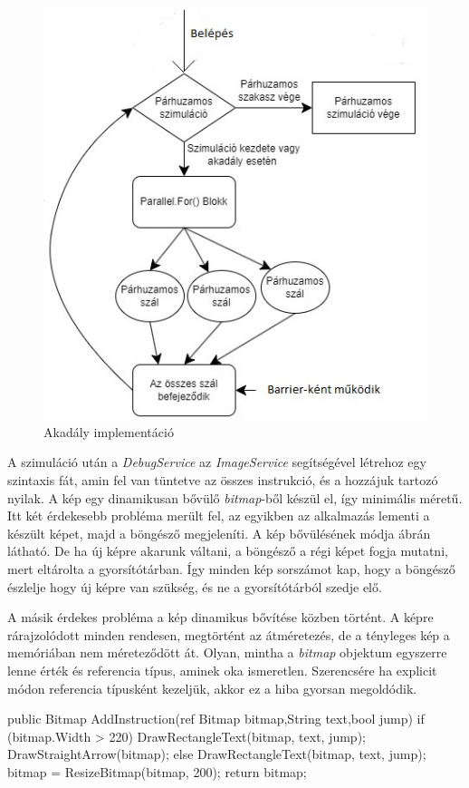 \begin{figure}[h]
\centering
\includegraphics[scale=0.9]{images/Barrier.jpg}
\caption{Akadály implementáció}
\label{fig:Barrier}
\end{figure}

A szimuláció után a \textit{DebugService} az \textit{ImageService} segítségével létrehoz egy szintaxis fát, amin fel van tüntetve az összes instrukció, és a hozzájuk tartozó nyilak. A kép egy dinamikusan bővülő \textit{bitmap}-ből készül el, így minimális méretű. Itt két érdekesebb probléma merült fel, az egyikben az alkalmazás lementi a készült képet, majd a böngésző megjeleníti. A kép bővülésének módja  ábrán látható. De ha új képre akarunk váltani, a böngésző a régi képet fogja mutatni, mert eltárolta a gyorsítótárban. Így minden kép sorszámot kap, hogy a böngésző észlelje hogy új képre van szükség, és ne a gyorsítótárból szedje elő. 

A másik érdekes probléma a kép dinamikus bővítése közben történt. A képre rárajzolódott minden rendesen, megtörtént az átméretezés, de a tényleges kép a memóriában nem méreteződött át. Olyan, mintha a \textit{bitmap} objektum egyszerre lenne érték és referencia típus, aminek oka ismeretlen. Szerencsére ha explicit módon referencia típusként kezeljük, akkor ez a hiba gyorsan megoldódik.

\begin{cpp}
public Bitmap AddInstruction(ref Bitmap bitmap,String text,bool jump)
{
      if (bitmap.Width > 220)
      {
           DrawRectangleText(bitmap, text, jump);
           DrawStraightArrow(bitmap);
       }
       else
       {
           DrawRectangleText(bitmap, text, jump);
       }
       bitmap = ResizeBitmap(bitmap, 200);
       return bitmap;
}
\end{cpp}

